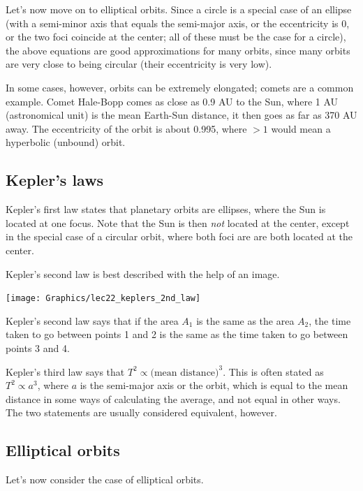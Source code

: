 \documentclass[8.01x]{subfiles}
\begin{document}
Let's now move on to elliptical orbits. Since a circle is a special case of an ellipse (with a semi-minor axis that equals the semi-major axis, or the eccentricity is 0, or the two foci coincide at the center; all of these must be the case for a circle), the above equations are good approximations for many orbits, since many orbits are very close to being circular (their eccentricity is very low).

In some cases, however, orbits can be extremely elongated; comets are a common example. Comet Hale-Bopp comes as close as 0.9 AU to the Sun, where 1 AU (astronomical unit) is the mean Earth-Sun distance, it then goes as far as 370 AU away. The eccentricity of the orbit is about 0.995, where $>1$ would mean a hyperbolic (unbound) orbit.

\subsection{Kepler's laws}

Kepler's first law states that planetary orbits are ellipses, where the Sun is located at one focus. Note that the Sun is then \emph{not} located at the center, except in the special case of a circular orbit, where both foci are are both located at the center.

Kepler's second law is best described with the help of an image.

\begin{center}
\texttt{[image: Graphics/lec22\_keplers\_2nd\_law]}
\end{center}

Kepler's second law says that if the area $A_1$ is the same as the area $A_2$, the time taken to go between points 1 and 2 is the same as the time taken to go between points 3 and 4.

Kepler's third law says that $T^2 \propto \text{(mean distance)}^3$. This is often stated as $T^2 \propto a^3$, where $a$ is the semi-major axis or the orbit, which is equal to the mean distance in some ways of calculating the average, and not equal in other ways. The two statements are usually considered equivalent, however.

\subsection{Elliptical orbits}

Let's now consider the case of elliptical orbits.
\end{document}
